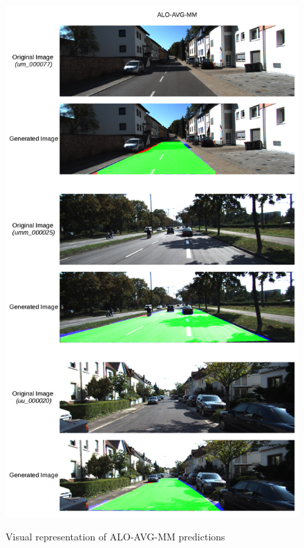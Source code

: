 \begin{figure}
  \centering
  \caption{Visual representation of ALO-AVG-MM predictions}
  \includegraphics[width=0.9\columnwidth]{../imagens/ilustracoes/cap6_kitti_visual_representation.png}
  \sourceOwn
  \label{fig:kitti_representacao_visual}
\end{figure}
